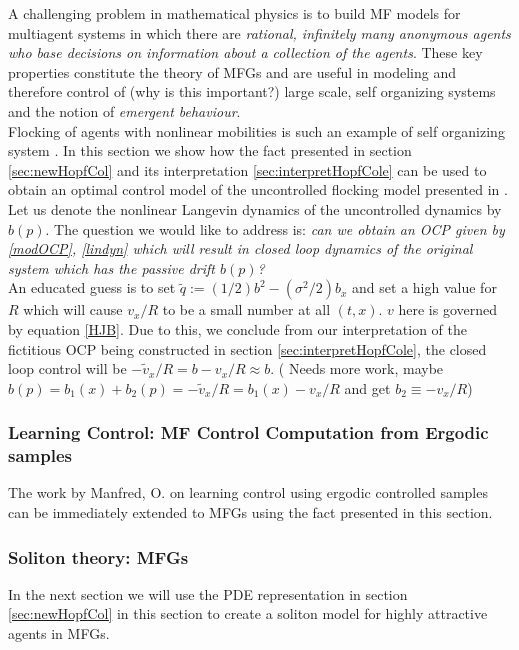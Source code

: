 \documentclass[letterpaper, 12pt]{article}
\begin{document}
A challenging problem in mathematical physics is to build MF models for multiagent systems in which there are \textit{rational, infinitely many anonymous agents who base decisions on information about a collection of the agents}. These key properties constitute the theory of MFGs and are useful in modeling and therefore control of (why is this important?) large scale, self organizing systems and the notion of \textit{emergent behaviour}. \\
\indent Flocking of agents with nonlinear mobilities is such an example of self organizing system \cite{barbaro2016phase, Bakshi2018Chaos}. In this section we show how the fact presented in section \ref{sec:newHopfCol} and its interpretation \ref{sec:interpretHopfCole} can be used to obtain an optimal control model of the uncontrolled flocking model presented in \cite{barbaro2016phase}. Let us denote the nonlinear Langevin dynamics of the uncontrolled dynamics by $b(p)$. The question we would like to address is: \textit{can we obtain an OCP given by \eqref{modOCP}, \eqref{lindyn} which will result in closed loop dynamics of the original system which has the passive drift $b(p)$?} \\
\indent An educated guess is to set $\tilde{q} := (1/2)b^2 - (\sigma^2/2) b_x$ and set a high value for $R$ which will cause $v_x/R$ to be a small number at all $(t,x)$. $v$ here is governed by equation \eqref{HJB}. Due to this, we conclude from our interpretation of the fictitious OCP being constructed in section \ref{sec:interpretHopfCole}, the closed loop control will be $-\tilde{v}_x/R = b - v_x/R \approx b$. {(\color{blue} Needs more work, maybe $b(p) = b_1(x) + b_2(p) = -\tilde{v}_x/R = b_1(x) - v_x/R$ and get $b_2 \equiv -v_x/R$)}

\subsubsection{Learning Control: MF Control Computation from Ergodic samples}

The work by Manfred, O. \cite{Opper2017} on learning control using ergodic controlled samples can be immediately extended to MFGs using the fact presented in this section.

\subsubsection{Soliton theory: MFGs}

In the next section we will use the PDE representation in section \ref{sec:newHopfCol} in this section to create a soliton model for highly attractive agents in MFGs.
\end{document}
